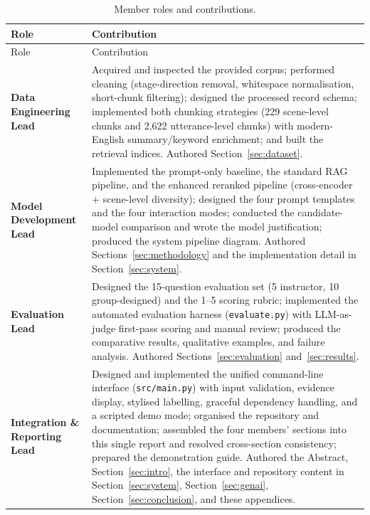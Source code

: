 \renewcommand{\arraystretch}{1.25}
\begin{longtable}{@{}p{3.6cm} p{12.2cm}@{}}
\caption{Member roles and contributions.}
\label{tab:contributions}\\
\toprule
Role & Contribution \\
\midrule
\endfirsthead
\toprule
Role & Contribution \\
\midrule
\endhead
\bottomrule
\endlastfoot
\textbf{Data Engineering Lead} &
Acquired and inspected the provided corpus; performed cleaning
(stage-direction removal, whitespace normalisation, short-chunk
filtering); designed the processed record schema; implemented both
chunking strategies (229 scene-level chunks and 2{,}622 utterance-level
chunks) with modern-English summary/keyword enrichment; and built the
retrieval indices. Authored Section~\ref{sec:dataset}. \\
\textbf{Model Development Lead} &
Implemented the prompt-only baseline, the standard RAG pipeline, and the
enhanced reranked pipeline (cross-encoder + scene-level diversity);
designed the four prompt templates and the four interaction modes;
conducted the candidate-model comparison and wrote the model
justification; produced the system pipeline diagram. Authored
Sections~\ref{sec:methodology} and the implementation detail in
Section~\ref{sec:system}. \\
\textbf{Evaluation Lead} &
Designed the 15-question evaluation set (5 instructor, 10 group-designed)
and the 1--5 scoring rubric; implemented the automated evaluation harness
(\texttt{evaluate.py}) with LLM-as-judge first-pass scoring and manual
review; produced the comparative results, qualitative examples, and
failure analysis. Authored Sections~\ref{sec:evaluation}
and~\ref{sec:results}. \\
\textbf{Integration \& Reporting Lead} &
Designed and implemented the unified command-line interface
(\texttt{src/main.py}) with input validation, evidence display, stylised
labelling, graceful dependency handling, and a scripted demo mode;
organised the repository and documentation; assembled the four members'
sections into this single report and resolved cross-section consistency;
prepared the demonstration guide. Authored the Abstract,
Section~\ref{sec:intro}, the interface and repository content in
Section~\ref{sec:system}, Section~\ref{sec:genai},
Section~\ref{sec:conclusion}, and these appendices. \\
\end{longtable}

